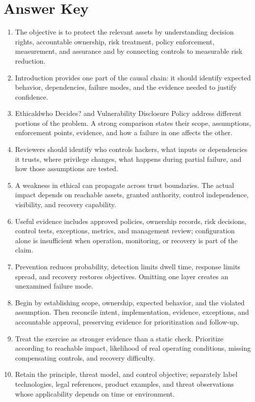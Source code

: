 \documentclass[11pt]{article}
\begin{document}
\section*{Answer Key}
\begin{enumerate}
\item The objective is to protect the relevant assets by understanding decision rights, accountable ownership, risk treatment, policy enforcement, measurement, and assurance and by connecting controls to measurable risk reduction.
\item Introduction provides one part of the causal chain: it should identify expected behavior, dependencies, failure modes, and the evidence needed to justify confidence.
\item Ethicaldwho Decides? and Vulnerability Disclosure Policy address different portions of the problem. A strong comparison states their scope, assumptions, enforcement points, evidence, and how a failure in one affects the other.
\item Reviewers should identify who controls hackers, what inputs or dependencies it trusts, where privilege changes, what happens during partial failure, and how those assumptions are tested.
\item A weakness in ethical can propagate across trust boundaries. The actual impact depends on reachable assets, granted authority, control independence, visibility, and recovery capability.
\item Useful evidence includes approved policies, ownership records, risk decisions, control tests, exceptions, metrics, and management review; configuration alone is insufficient when operation, monitoring, or recovery is part of the claim.
\item Prevention reduces probability, detection limits dwell time, response limits spread, and recovery restores objectives. Omitting one layer creates an unexamined failure mode.
\item Begin by establishing scope, ownership, expected behavior, and the violated assumption. Then reconcile intent, implementation, evidence, exceptions, and accountable approval, preserving evidence for prioritization and follow-up.
\item Treat the exercise as stronger evidence than a static check. Prioritize according to reachable impact, likelihood of real operating conditions, missing compensating controls, and recovery difficulty.
\item Retain the principle, threat model, and control objective; separately label technologies, legal references, product examples, and threat observations whose applicability depends on time or environment.
\end{enumerate}
\end{document}
